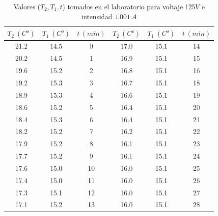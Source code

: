 \documentclass[12pt,a4paper]{article}
\begin{document}
\newpage

\begin{table}[h!] 	 \centering 
\begin{tabular}{|c|c|c||c|c|c|} 
\hline 
$T_2 \ (C^o)$ & $T_1 \ (C^o) $ & $t \ (min)$ & $T_2 \ (C^o)$ & $T_1 \ (C^o) $ & $t \ (min)$ \\ \hline 
21.2 &  14.5 & 0 & 17.0 & 15.1 & 14 \\ 
20.2 &  14.5 & 1 & 16.9 & 15.1 & 15 \\ 
19.6 &  15.2 & 2 & 16.8 & 15.1 & 16 \\ 
19.2 &  15.3 & 3 & 16.7 & 15.1 & 18 \\ 
18.9 &  15.3 & 4 & 16.6 & 15.1 & 19 \\ 
18.6 &  15.2 & 5 & 16.4 & 15.1 & 20 \\ 
18.4 &  15.3 & 6 & 16.4 & 15.1 & 21 \\ 
18.2 &  15.2 & 7 & 16.2 & 15.1 & 22 \\ 
17.9 &  15.2 & 8 & 16.1 & 15.1 & 23 \\ 
17.7 &  15.2 & 9 & 16.1 & 15.1 & 24 \\ 
17.6 &  15.0 & 10 & 16.0 & 15.1 & 25 \\ 
17.4 &  15.0 & 11 & 16.0 & 15.1 & 26 \\ 
17.3 &  15.1 & 12 & 16.0 & 15.1 & 27 \\ 
17.1 &  15.2 & 13 & 16.0 & 15.1 & 28 \\ 
\hline 
\end{tabular} 
\caption{Valores ($T_2,T_1,t$) tomados en el laboratorio para voltaje 125$V$ e intensidad $1.001 \ A$} 
\label{tab:} 
\end{table} 
\end{document}
